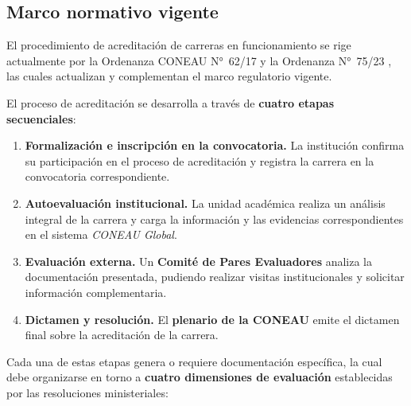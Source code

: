\subsection{Marco normativo vigente}

El procedimiento de acreditación de carreras en funcionamiento se rige actualmente por la 
Ordenanza CONEAU N°~62/17 \citep{ordenanza62} y la Ordenanza N°~75/23 \citep{ordenanza75}, 
las cuales actualizan y complementan el marco regulatorio vigente.

El proceso de acreditación se desarrolla a través de \textbf{cuatro etapas secuenciales}:

\begin{enumerate}
    \item \textbf{Formalización e inscripción en la convocatoria.}  
    La institución confirma su participación en el proceso de acreditación y registra la carrera 
    en la convocatoria correspondiente.

    \item \textbf{Autoevaluación institucional.}  
    La unidad académica realiza un análisis integral de la carrera y carga la información y 
    las evidencias correspondientes en el sistema \textit{CONEAU Global}.

    \item \textbf{Evaluación externa.}  
    Un \textbf{Comité de Pares Evaluadores} analiza la documentación presentada, pudiendo 
    realizar visitas institucionales y solicitar información complementaria.

    \item \textbf{Dictamen y resolución.}  
    El \textbf{plenario de la CONEAU} emite el dictamen final sobre la acreditación de la carrera.
\end{enumerate}

Cada una de estas etapas genera o requiere documentación específica, la cual debe organizarse 
en torno a \textbf{cuatro dimensiones de evaluación} establecidas por las resoluciones ministeriales:

